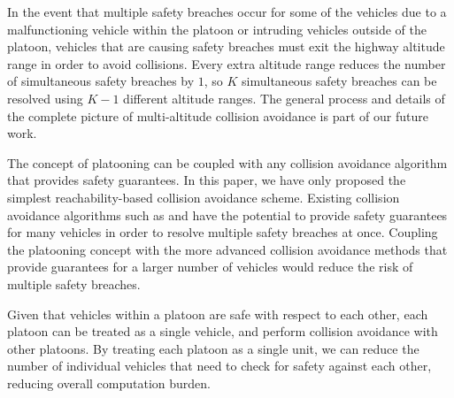 In the event that multiple safety breaches occur for some of the vehicles due to a malfunctioning vehicle within the platoon or intruding vehicles outside of the platoon, vehicles that are causing safety breaches must exit the highway altitude range in order to avoid collisions. Every extra altitude range reduces the number of simultaneous safety breaches by $1$, so $K$ simultaneous safety breaches can be resolved using $K-1$ different altitude ranges. The general process and details of the complete picture of multi-altitude collision avoidance is part of our future work. 

The concept of platooning can be coupled with any collision avoidance algorithm that provides safety guarantees. In this paper, we have only proposed the simplest reachability-based collision avoidance scheme. Existing collision avoidance algorithms such as \cite{Bansal16} and \cite{Chen16} have the potential to provide safety guarantees for many vehicles in order to resolve multiple safety breaches at once. Coupling the platooning concept with the more advanced collision avoidance methods that provide guarantees for a larger number of vehicles would reduce the risk of multiple safety breaches.

Given that vehicles within a platoon are safe with respect to each other, each platoon can be treated as a single vehicle, and perform collision avoidance with other platoons. By treating each platoon as a single unit, we can reduce the number of individual vehicles that need to check for safety against each other, reducing overall computation burden.